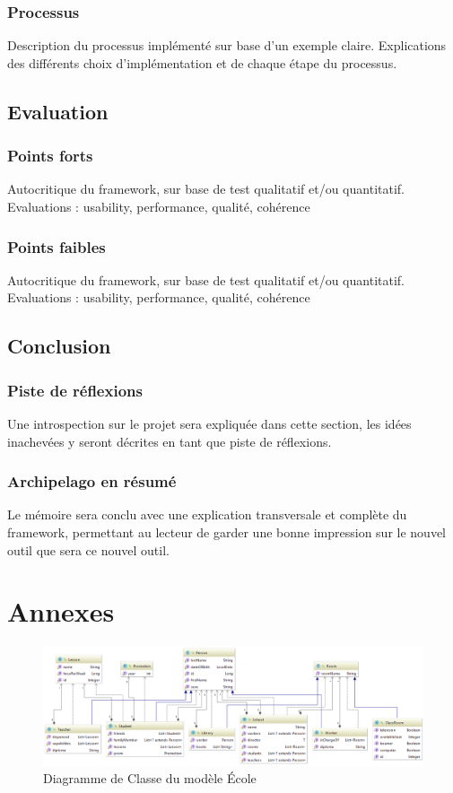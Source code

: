 \documentclass[a4paper,fleqn,12pt]{report}
\begin{document}
\section{Processus}
Description du processus implémenté sur base d’un exemple claire. Explications des différents choix d’implémentation et de chaque étape du processus.
\chapter{Evaluation}
\section{Points forts}
Autocritique du framework, sur base de test qualitatif et/ou quantitatif. Evaluations :
usability, performance, qualité, cohérence
\section{Points faibles}
Autocritique du framework, sur base de test qualitatif et/ou quantitatif. Evaluations :
usability, performance, qualité, cohérence
\chapter{Conclusion}
\section{Piste de réflexions}
Une introspection sur le projet sera expliquée dans cette section, les idées inachevées y seront décrites en tant que piste de réflexions.
\section{Archipelago en résumé}
Le mémoire sera conclu avec une explication transversale et complète du framework, permettant au lecteur de garder une bonne impression sur le nouvel outil que sera ce nouvel outil.
\part{Annexes}
\begin{figure}
    \includegraphics[scale=0.8]{figures/SchoolDiag.png}
    \caption{Diagramme de Classe du modèle École}
    \label{fig:SchoolDiagram}
\end{figure}
\end{document}
